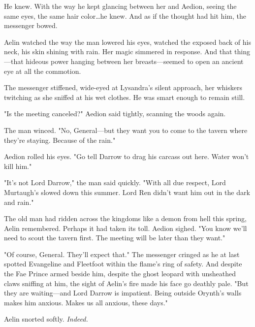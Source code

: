 He knew.
With the way he kept glancing between her and Aedion, seeing the same eyes, the same hair color\ldots he knew.
And as if the thought had hit him, the messenger bowed.

Aelin watched the way the man lowered his eyes, watched the exposed back of his neck, his skin shining with rain.
Her magic simmered in response.
And that thing---that hideous power hanging between her breasts---seemed to open an ancient eye at all the commotion.

The messenger stiffened, wide-eyed at Lysandra's silent approach, her whiskers twitching as she sniffed at his wet clothes.
He was smart enough to remain still.

"Is the meeting canceled?"
Aedion said tightly, scanning the woods again.

The man winced.
"No, General---but they want you to come to the tavern where they're staying.
Because of the rain."

Aedion rolled his eyes.
"Go tell Darrow to drag his carcass out here.
Water won't kill him."

"It's not Lord Darrow," the man said quickly.
"With all due respect, Lord Murtaugh's slowed down this summer.
Lord Ren didn't want him out in the dark and rain."

The old man had ridden across the kingdoms like a demon from hell this spring, Aelin remembered.
Perhaps it had taken its toll.
Aedion sighed.
"You know we'll need to scout the tavern first.
The meeting will be later than they want."

"Of course, General.
They'll expect that."
The messenger cringed as he at last spotted Evangeline and Fleetfoot within the flame's ring of safety.
And despite the Fae Prince armed beside him, despite the ghost leopard with unsheathed claws sniffing at him, the sight of Aelin's fire made his face go deathly pale.
"But they are waiting---and Lord Darrow is impatient.
Being outside Orynth's walls makes him anxious.
Makes us all anxious, these days."


Aelin snorted softly.
\emph{Indeed.}

